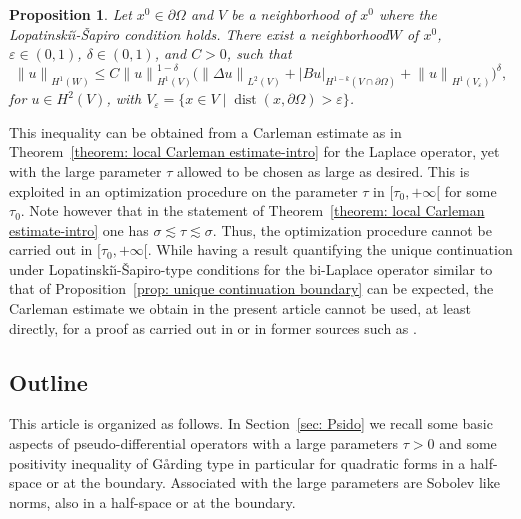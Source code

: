 \documentclass[10pt]{amsart}
\let\sep\mid
\theoremstyle{plain}
\newtheorem{proposition}[theorem]{Proposition}
\theoremstyle{definition}
\newcommand{\LS}{Lopatinski\u{\i}-\v{S}apiro\xspace}
\newcommand{\nhd}{neighborhood\xspace}
\let\eps\varepsilon
\newcommand{\Norm}[2]{{\| #1 \|}_{#2}}
\newcommand{\norm}[2]{{|#1|}_{#2}}
\DeclareMathOperator{\dist}{dist}
\begin{document}
\begin{proposition}
\label{prop: unique continuation boundary}
Let $x^0\in\partial \Omega$ and $V$ be a \nhd of $x^0$ where the \LS
condition holds. There exist a \nhd $W$ of $x^0$, $\eps\in
(0,1)$, $\delta \in (0,1)$, and $C>0$, such that
\begin{equation}
\label{eq: local interpolation at the boundary-manifold1}
\Norm{u}{H^1(W)}
\leq C \Norm{u}{H^1(V)}^{1-\delta}
\Big(\Norm{\Delta u}{L^2(V)}
+ \norm{B u}{H^{1-k}(V \cap \partial \Omega)}
+ \Norm{u}{H^1(V_\eps)}
\Big)^\delta,
\end{equation}
for $u \in H^2(V)$, with
$V_\eps = \{ x\in V\sep \dist(x, \partial\Omega) > \eps \}$.
\end{proposition}
This inequality can be obtained from a Carleman estimate as in
Theorem~\ref{theorem: local Carleman estimate-intro} for the Laplace
operator, yet with the large parameter $\tau$ allowed to be chosen as
large as desired. This is exploited in an optimization procedure on
the parameter $\tau$ in $[\tau_0,+\infty[$ for some $\tau_0$. Note
however that in the statement of Theorem~\ref{theorem: local Carleman
estimate-intro} one has $\sigma \lesssim \tau \lesssim
\sigma$. Thus, the
optimization procedure cannot be carried out in $[\tau_0,+\infty[$. While having a
result quantifying the unique continuation under \LS-type conditions
for the bi-Laplace operator
similar to that of Proposition~\ref{prop: unique continuation
boundary} can be
expected, the Carleman estimate we obtain in the present article cannot be used, at
least directly, for a proof as carried out in \cite{JGL-vol1} or in
former sources such as \cite{LR:95}.

\subsection{Outline}
This article is organized as follows.
In Section~\ref{sec: Psido} we recall some basic aspects of
pseudo-differential operators with a large parameters $\tau>0$ and
some positivity inequality of G{\aa}rding type in particular for
quadratic forms in a half-space or at the boundary. Associated with
the large parameters are Sobolev like norms, also in a half-space or
at the boundary.
\end{document}
